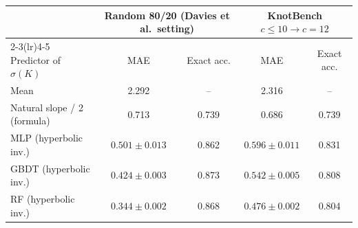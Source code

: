 \begin{tabular}{l c c c c}
\toprule
 & \multicolumn{2}{c}{Random 80/20 (Davies et al.\ setting)} & \multicolumn{2}{c}{KnotBench $c\le10\to c=12$}\\
\cmidrule(lr){2-3}\cmidrule(lr){4-5}
Predictor of $\sigma(K)$ & MAE & Exact acc. & MAE & Exact acc.\\
\midrule
Mean & 2.292 & -- & 2.316 & --\\
Natural slope / 2 (formula) & 0.713 & 0.739 & 0.686 & 0.739\\
MLP (hyperbolic inv.) & $0.501\pm0.013$ & 0.862 & $0.596\pm0.011$ & 0.831\\
GBDT (hyperbolic inv.) & $0.424\pm0.003$ & 0.873 & $0.542\pm0.005$ & 0.808\\
RF (hyperbolic inv.) & $0.344\pm0.002$ & 0.868 & $0.476\pm0.002$ & 0.804\\
\bottomrule
\end{tabular}
